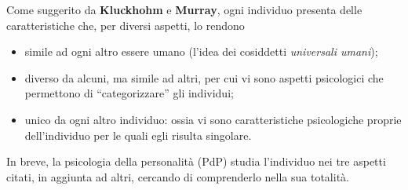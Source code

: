 \documentclass{subfiles}
\begin{document}
Come suggerito da \textbf{Kluckhohm} e \textbf{Murray}, ogni individuo presenta delle caratteristiche che,
per diversi aspetti, lo rendono
\begin{itemize}
    \item simile ad ogni altro essere umano (l'idea dei cosiddetti \emph{universali umani});
    \item diverso da alcuni, ma simile ad altri, per cui vi sono aspetti psicologici che permettono di ``categorizzare'' gli individui;
    \item unico da ogni altro individuo: ossia vi sono caratteristiche psicologiche proprie dell'individuo per le quali egli risulta singolare.
\end{itemize}
In breve, la psicologia della personalità (PdP) studia l'individuo nei tre aspetti citati, in aggiunta ad altri,
cercando di comprenderlo nella sua totalità.
\end{document}
